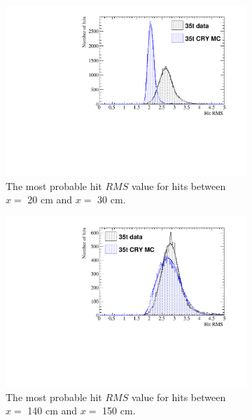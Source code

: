 \begin{figure}
  \centering
  \begin{subfigure}{0.48\textwidth}
    \centering
    \includegraphics[width=\textwidth]{CombCan_0}
    \caption{The most probable hit $RMS$ value for hits between $x =$ 20 cm and $x =$ 30 cm.}
  \end{subfigure}%
  \hspace{0.03\textwidth}%
  \begin{subfigure}{0.48\textwidth}
    \centering
    \includegraphics[width=\textwidth]{CombCan_1}
    \caption{The most probable hit $RMS$ value for hits between $x =$ 140 cm and $x =$ 150 cm.}
  \end{subfigure}
  \begin{subfigure}{0.48\textwidth}
    \centering

\end{subfigure}
\end{figure}

